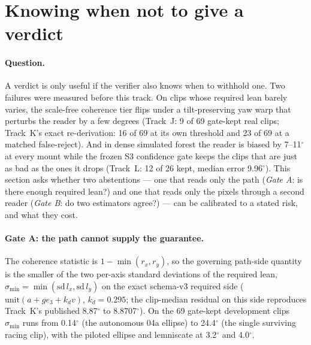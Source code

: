 
\section{Knowing when not to give a verdict}
\label{sec:abstention-gates}

\paragraph{Question.}
A verdict is only useful if the verifier also knows when to withhold one. Two failures were
measured before this track. On clips whose required lean barely varies, the scale-free
coherence tier flips under a tilt-preserving yaw warp that perturbs the reader by a few degrees
(Track~J: 9 of 69 gate-kept real clips; Track~K's exact re-derivation: 16 of 69 at its own
threshold and 23 of 69 at a matched false-reject). And in dense simulated forest the reader is
biased by 7--11$^\circ$ at every mount while the frozen S3 confidence gate keeps the clips that
are just as bad as the ones it drops (Track~L: 12 of 26 kept, median error 9.96$^\circ$). This
section asks whether two abstentions --- one that reads only the path (\emph{Gate A}: is there
enough required lean?) and one that reads only the pixels through a second reader
(\emph{Gate B}: do two estimators agree?) --- can be calibrated to a stated risk, and what they
cost.

\paragraph{Gate A: the path cannot supply the guarantee.}
The coherence statistic is $1-\min(r_x,r_y)$, so the governing path-side quantity is the
smaller of the two per-axis standard deviations of the required lean,
$\sigma_{\min}=\min(\mathrm{sd}\,l_x,\mathrm{sd}\,l_y)$ on the exact schema-v3 required side
($\mathrm{unit}(a+g e_3+k_d v)$, $k_d=0.295$; the clip-median residual on this side reproduces
Track~K's published 8.87$^\circ$ to 8.8707$^\circ$). On the 69 gate-kept development clips
$\sigma_{\min}$ runs from 0.14$^\circ$ (the autonomous 04a ellipse) to 24.4$^\circ$ (the single
surviving racing clip), with the piloted ellipse and lemniscate at 3.2$^\circ$ and
4.0$^\circ$.

